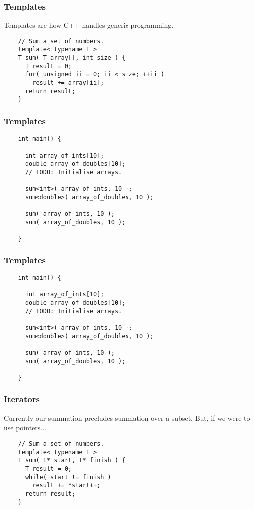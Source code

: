 \begin{frame}[fragile]
  \frametitle{Templates}
  Templates are how C++ handles generic programming.
  \begin{example}
    \begin{lstlisting}
    // Sum a set of numbers.
    template< typename T >
    T sum( T array[], int size ) {
      T result = 0;
      for( unsigned ii = 0; ii < size; ++ii )
        result += array[ii];
      return result;
    }
    \end{lstlisting}
  \end{example}
\end{frame}

\begin{frame}[fragile]
  \frametitle{Templates}
  \begin{example}
    \begin{lstlisting}
    int main() {

      int array_of_ints[10];
      double array_of_doubles[10];
      // TODO: Initialise arrays.

      sum<int>( array_of_ints, 10 );
      sum<double>( array_of_doubles, 10 );

      sum( array_of_ints, 10 );
      sum( array_of_doubles, 10 );

    }
    \end{lstlisting}
  \end{example}
\end{frame}

\begin{frame}[fragile]
  \frametitle{Templates}
  \begin{example}
    \begin{lstlisting}
    int main() {

      int array_of_ints[10];
      double array_of_doubles[10];
      // TODO: Initialise arrays.

      sum<int>( array_of_ints, 10 );
      sum<double>( array_of_doubles, 10 );

      sum( array_of_ints, 10 );
      sum( array_of_doubles, 10 );

    }
    \end{lstlisting}
  \end{example}
\end{frame}

\begin{frame}[fragile]
  \frametitle{Iterators}
  Currently our summation precludes summation over a subset.
  But, if we were to use pointers...
  \begin{example}
    \begin{lstlisting}
    // Sum a set of numbers.
    template< typename T >
    T sum( T* start, T* finish ) {
      T result = 0;
      while( start != finish )
        result += *start++;
      return result;
    }
    \end{lstlisting}
  \end{example}
\end{frame}

